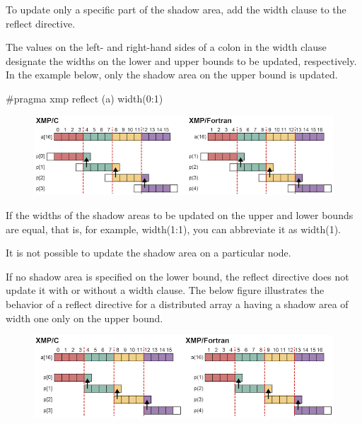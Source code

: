 To update only a specific part of the shadow area, add the width clause
to the reflect directive.

The values on the left- and right-hand sides of a colon in the width
clause designate the widths on the lower and upper bounds to be updated,
respectively. In the example below, only the shadow area on the upper
bound is updated.

\begin{XCexample}
#pragma xmp reflect (a) width(0:1)
\end{XCexample}


\begin{figure}
  \centering
  \includegraphics{figs/reflect_width.png}
\end{figure}

\begin{mynote}
If the widths of the shadow areas to be updated on
the upper and lower 
bounds are equal, that is, for example, width(1:1), you can abbreviate
it as width(1).
\end{mynote}

\begin{mynote}
It is not possible to update the shadow area on a
particular node. 
\end{mynote}

If no shadow area is specified on the lower bound, the reflect directive
does not update it with or without a width clause. The below figure
illustrates the behavior of a reflect directive for a distributed array
a having a shadow area of width one only on the upper bound.

\begin{figure}
  \centering
  \includegraphics{figs/reflect_uneven.png}
\end{figure}

